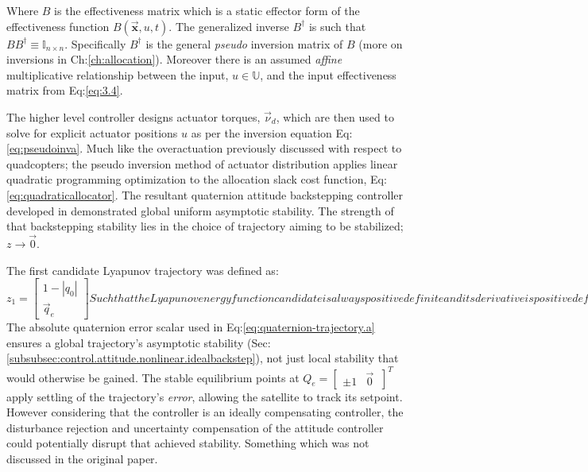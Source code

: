 Where $B$ is the effectiveness matrix which is a static effector form of the effectiveness function $B(\vec{\mathbf{x}},u,t)$. The generalized inverse $B^{\dagger}$ is such that $BB^{\dagger}\equiv\mathbb{I}_{n\times n}$. Specifically $B^{\dagger}$ is the general \emph{pseudo} inversion matrix of $B$ (more on inversions in Ch:\ref{ch:allocation}). Moreover there is an assumed \emph{affine} multiplicative relationship between the input, $u\in\mathbb{U}$, and the input effectiveness matrix from Eq:\ref{eq:3.4}. 
\par
The higher level controller designs actuator torques, $\vec{\nu}_d$, which are then used to solve for explicit actuator positions $u$ as per the inversion equation Eq:\ref{eq:pseudoinva}. Much like the overactuation previously discussed with respect to quadcopters; the pseudo inversion method of actuator distribution applies linear quadratic programming optimization to the allocation slack cost function, Eq:\ref{eq:quadraticallocator}. The resultant quaternion attitude backstepping controller developed in \cite{satellitebackstepping} demonstrated global uniform asymptotic stability. The strength of that backstepping stability lies in the choice of trajectory aiming to be stabilized; $z\rightarrow\vec{0}$. 
\par
The first candidate Lyapunov trajectory was defined as:
\begin{subequations}
\begin{equation}\label{eq:quaternion-trajectory.a}
z_1=\begin{bmatrix}
1-|q_0|\\
\vec{q}_e
\end{bmatrix}
\end{equation}
Such that the Lyapunov energy function candidate is always positive definite and its derivative is positive definite descrescent. The particulars of that stability proof are omitted but it is worth detailing their chosen candidate function:
\begin{equation}
V_1(z)=z_1\text{}^Tz_1>0~~~~\forall[q_0,\vec{q}_e]
\end{equation}
\end{subequations}
The absolute quaternion error scalar used in Eq:\ref{eq:quaternion-trajectory.a} ensures a global trajectory's asymptotic stability (Sec:\ref{subsubsec:control.attitude.nonlinear.idealbackstep}), not just local stability that would otherwise be gained. The stable equilibrium points at $Q_e=\begin{bmatrix}
\pm 1 & \vec{0}~
\end{bmatrix}^T$ apply settling of the trajectory's \emph{error}, allowing the satellite to track its setpoint. However considering that the controller is an ideally compensating controller, the disturbance rejection and uncertainty compensation of the attitude controller could potentially disrupt that achieved stability. Something which was not discussed in the original paper.